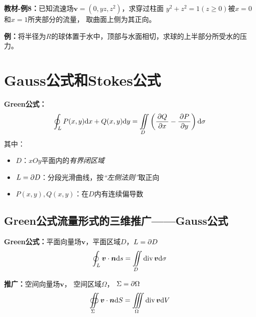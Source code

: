 % 

{\bf 教材-例8：}已知流速场$\bm{v}=(0,yz,z^2)$，求穿过柱面
$y^2+z^2=1(z\geq 0)$被$x=0$和$x=1$所夹部分的流量，
取曲面上侧为其正向。

{\bf 例：}将半径为$R$的球体置于水中，顶部与水面相切，求球的上半部分所受水的压力。

\section{Gauss公式和Stokes公式}

{\bf Green公式：}
$$\oint_LP(x,y)\mathrm{d} x+Q(x,y)\mathrm{d} y=\iint\limits_D\left(
\displaystyle\frac{\,{\partial Q}\,}{\,{\partial x}\,}-\displaystyle\frac{\,{\partial P}\,}{\,{\partial y}\,}\right)\mathrm{d}\sigma $$
其中：
\begin{itemize}
  \item {$D$：}$xOy$平面内的{\it 有界闭区域}
  \item {$L=\partial D$：}分段光滑曲线，按{\it “左侧法则”}取正向
  \item {$P(x,y),Q(x,y)$：}在$D$内有连续偏导数
\end{itemize}

\subsection{Green公式流量形式的三维推广——Gauss公式}

{\bf Green公式：}平面向量场$\bm{v}$，平面区域$D$，$L=\partial D$
$${\oint_L\bm{v}\cdot\bm{n}\mathrm{d} s=\iint\limits_D\mathrm{div}\,\bm{v}\mathrm{d}\sigma}$$

{\bf 推广：}空间向量场$\bm{v}$， 空间区域$\Omega$， $\Sigma=\partial\Omega$
$${\oiint\limits_{\Sigma}\bm{v}\cdot\bm{n}\mathrm{d}
S=\iiint\limits_{\Omega}\mathrm{div}\,\bm{v}\mathrm{d} V}$$

